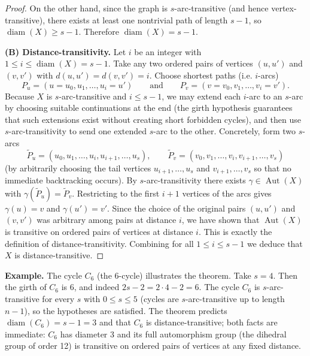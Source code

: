 \documentclass[12pt,a4paper,openany]{book}
\begin{document}
\begin{proof}
On the other hand, since the graph is \(s\)-arc-transitive (and hence
vertex-transitive), there exists at least one nontrivial path of length
\(s-1\), so \(\operatorname{diam}(X)\ge s-1\). Therefore
\(\operatorname{diam}(X)=s-1\).

\medskip\noindent\textbf{(B) Distance-transitivity.}  
Let \(i\) be an integer with \(1\le i\le\operatorname{diam}(X)=s-1\).
Take any two ordered pairs of vertices \((u,u')\) and \((v,v')\) with
\(d(u,u')=d(v,v')=i\). Choose shortest paths (i.e. \(i\)-arcs)
\[
P_u=(u=u_0,u_1,\dots,u_i=u')\qquad\text{and}\qquad
P_v=(v=v_0,v_1,\dots,v_i=v').
\]
Because \(X\) is \(s\)-arc-transitive and \(i\le s-1\), we may extend
each \(i\)-arc to an \(s\)-arc by choosing suitable continuations at the
end (the girth hypothesis guarantees that such extensions exist without
creating short forbidden cycles), and then use \(s\)-arc-transitivity to
send one extended \(s\)-arc to the other. Concretely, form two
\(s\)-arcs
\[
\widetilde P_u=(u_0,u_1,\dots,u_i,u_{i+1},\dots,u_s),\qquad
\widetilde P_v=(v_0,v_1,\dots,v_i,v_{i+1},\dots,v_s)
\]
(by arbitrarily choosing the tail vertices \(u_{i+1},\dots,u_s\) and
\(v_{i+1},\dots,v_s\) so that no immediate backtracking occurs). By
\(s\)-arc-transitivity there exists \(\gamma\in\operatorname{Aut}(X)\)
with \(\gamma(\widetilde P_u)=\widetilde P_v\). Restricting to the
first \(i+1\) vertices of the arcs gives \(\gamma(u)=v\) and
\(\gamma(u')=v'\). Since the choice of the original pairs \((u,u')\)
and \((v,v')\) was arbitrary among pairs at distance \(i\), we have
shown that \(\operatorname{Aut}(X)\) is transitive on ordered pairs of
vertices at distance \(i\). This is exactly the definition of
distance-transitivity. Combining for all \(1\le i\le s-1\) we deduce
that \(X\) is distance-transitive.
\end{proof}

\bigskip

\noindent\textbf{Example.} The cycle \(C_6\) (the 6-cycle) illustrates the
theorem. Take \(s=4\). Then the girth of \(C_6\) is \(6\), and indeed
\(2s-2=2\cdot4-2=6\). The cycle \(C_6\) is \(s\)-arc-transitive for every
\(s\) with \(0\le s\le 5\) (cycles are \(s\)-arc-transitive up to length
\(n-1\)), so the hypotheses are satisfied. The theorem predicts
\(\operatorname{diam}(C_6)=s-1=3\) and that \(C_6\) is
distance-transitive; both facts are immediate: \(C_6\) has diameter 3
and its full automorphism group (the dihedral group of order 12) is
transitive on ordered pairs of vertices at any fixed distance.
\end{document}
